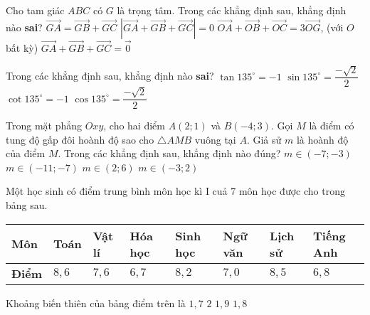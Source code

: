 \begin{ex}%
	Cho tam giác $ABC$ có $G$ là trọng tâm. Trong các khẳng định sau, khẳng định nào \textbf{sai}?
	\choice
	{\True $\overrightarrow{GA}=\overrightarrow{GB}+\overrightarrow{GC}$}
	{$|\overrightarrow{GA}+\overrightarrow{GB}+\overrightarrow{GC}|=0$}
	{$\overrightarrow{OA}+\overrightarrow{OB}+\overrightarrow{OC}=3\overrightarrow{OG}$, (với $O$ bất kỳ)}
	{$\overrightarrow{GA}+\overrightarrow{GB}+\overrightarrow{GC}=\overrightarrow{0}$}
\end{ex}

\begin{ex}%
	Trong các khẳng định sau, khẳng định nào \textbf{sai}?
	\choice
	{$\tan 135^{\circ}=-1$}
	{\True $\sin 135^{\circ}=\dfrac{-\sqrt{2}}{2}$}
	{$\cot 135^{\circ}=-1$}
	{$\cos 135^{\circ}=\dfrac{-\sqrt{2}}{2}$}
\end{ex}

\begin{ex}%
	Trong mặt phẳng $Oxy$, cho hai điểm $A(2; 1)$ và $B(-4; 3)$. Gọi $M$ là điểm có tung độ gấp đôi hoành độ sao cho $\triangle AMB$ vuông tại $A$. Giả sử $m$ là hoành độ của điểm $M$. Trong các khẳng định sau, khẳng định nào đúng?
	\choice
	{$m\in (-7;-3)$}
	{$m\in (-11;-7)$}
	{\True $m\in (2; 6)$}
	{$m\in (-3; 2)$}
\end{ex}


\begin{ex}%
Một học sinh có điểm trung bình môn học kì I cuả 7 môn học được cho trong bảng sau.
\begin{center}
\renewcommand\arraystretch{1.5}
\begin{tabular}{|>{\raggedright\arraybackslash}m{1.2cm} |>{\centering\arraybackslash}m{1.6cm}|>{\centering\arraybackslash}m{1.6cm}|>{\centering\arraybackslash}m{1.6cm}|>{\centering\arraybackslash}m{1.6cm}|>{\centering\arraybackslash}m{1.7cm}|>{\centering\arraybackslash}m{1.6cm}|>{\centering\arraybackslash}m{2cm}|}
\hline
\textbf{Môn} &Toán & Vật lí&Hóa học&Sinh học&Ngữ văn & Lịch sử&Tiếng Anh\\ 
\hline
\textbf{Điểm}&$8{,}6$ &$7{,}6$&$6{,}7$&$8{,}2$&$7{,}0$&$8{,}5$&$6{,}8$\\
\hline 
\end{tabular}
\end{center}
Khoảng biến thiên của bảng điểm trên là
\choice
{$1{,}7$}
{$2$}
{\True $1{,}9$}
{$1{,}8$}
\end{ex}

